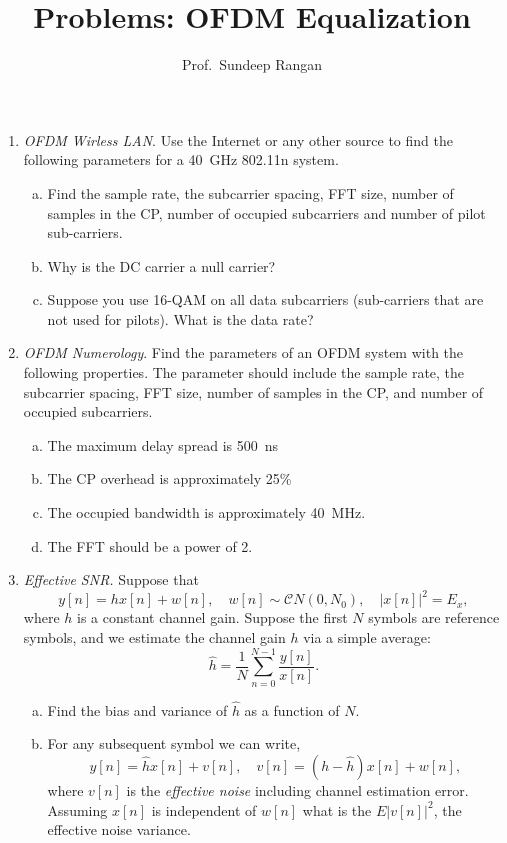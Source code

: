 \documentclass[11pt]{article}
\begin{document}
\title{Problems:  OFDM Equalization}
\author{Prof.\ Sundeep Rangan}
\date{}

\maketitle

\begin{enumerate}

\item \emph{OFDM Wirless LAN}.  Use the Internet or any other source
to find the following parameters for a 40~GHz 802.11n system.
\begin{enumerate}[(a)]
\item Find the sample rate, the subcarrier spacing,
FFT size, number of samples in the CP, number of occupied subcarriers and number of pilot sub-carriers.
\item Why is the DC carrier a null carrier?
\item Suppose you use 16-QAM on all data subcarriers (sub-carriers that
are not used for pilots).  What is the data rate?
\end{enumerate}

\item \emph{OFDM Numerology}.  Find the parameters of an OFDM system
with the following properties.  The parameter should include
the sample rate, the subcarrier spacing, FFT size, number of samples in the CP,
and number of occupied subcarriers.
\begin{enumerate}[(a)]
\item The maximum delay spread is 500~ns
\item The CP overhead is approximately 25\%
\item The occupied bandwidth is approximately 40~MHz.
\item The FFT should be a power of 2.
\end{enumerate}

\item \emph{Effective SNR.}  Suppose that
\[
    y[n]=hx[n]+w[n], \quad w[n] \sim {\mathcal CN}(0,N_0), \quad |x[n]|^2 = E_x,
\]
where $h$ is a constant channel gain.  Suppose the first $N$ symbols are reference symbols,
and we estimate the channel gain $h$ via a simple average:
\[
    \widehat{h} = \frac{1}{N} \sum_{n=0}^{N-1} \frac{y[n]}{x[n]}.
\]
\begin{enumerate}[(a)]
\item Find the bias and variance of $\widehat{h}$ as a function of $N$.
\item For any subsequent symbol we can write,
\[
    y[n] = \widehat{h}x[n] + v[n], \quad v[n] = (h-\widehat{h})x[n] + w[n],
\]
where $v[n]$ is the \emph{effective noise} including channel estimation error.
Assuming $x[n]$ is independent of $w[n]$ what is the $E|v[n]|^2$, the effective noise variance.


\end{enumerate}
\end{enumerate}
\end{document}
